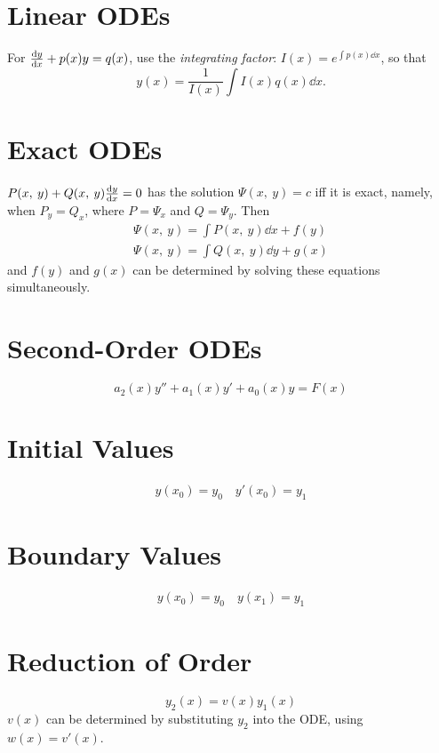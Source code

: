 \documentclass{article}
\begin{document}
\begin{multicols}{3}
    \section*{Linear ODEs}
    For \(\dv{y}{x} + p(x)y = q(x)\), use the \textit{integrating factor}:
    \(I(x) = e^{\int p(x) \dd{x}}\), so that
    \begin{equation*}
        y(x) = \frac{1}{I(x)} \int I(x) q(x) \dd{x}.
    \end{equation*}
    \section*{Exact ODEs}
    \(P(x,\: y) + Q(x,\: y)\dv{y}{x} = 0\)
    has the solution
    \(\Psi(x,\: y) = c\)
    iff it is exact, namely, when
    \(P_y = Q_x\),
    where \(P = \Psi_x\) and \(Q = \Psi_y\). Then
    \begin{gather*}
        \Psi(x,\: y) = \int P(x,\: y) \dd{x} + f(y) \\
        \Psi(x,\: y) = \int Q(x,\: y) \dd{y} + g(x)
    \end{gather*}
    and \(f(y)\) and \(g(x)\) can be determined by solving these equations simultaneously.
    \section*{Second-Order ODEs}
    \begin{equation*}
        a_2(x)y'' + a_1(x)y' + a_0(x)y = F(x)
    \end{equation*}
    \section*{Initial Values}
    \begin{align*}
        y(x_0) = y_0 \quad y'(x_0) = y_1
    \end{align*}
    \section*{Boundary Values}
    \begin{align*}
        y(x_0) = y_0 \quad y(x_1) = y_1
    \end{align*}
    \section*{Reduction of Order}
    \begin{equation*}
        y_2(x) = v\left(x\right) y_1(x)
    \end{equation*}
    \(v(x)\) can be determined by substituting \(y_2\) into the ODE, using \(w(x) = v'(x)\).

\end{multicols}
\end{document}
